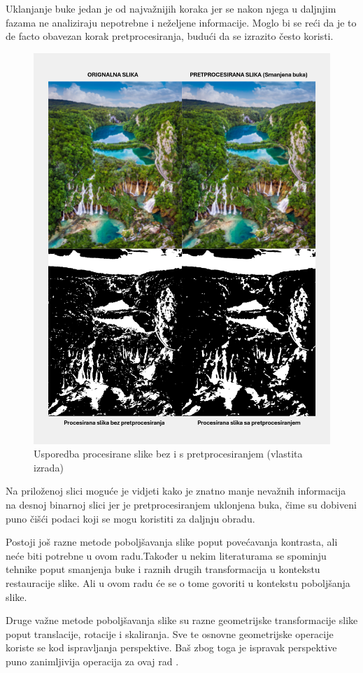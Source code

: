 \documentclass{foi}
\begin{document}
Uklanjanje buke jedan je od najvažnijih koraka jer se nakon njega u daljnjim fazama ne analiziraju nepotrebne i neželjene informacije. Moglo bi se reći da je to de facto obavezan korak pretprocesiranja, budući da se izrazito često koristi.

\begin{figure}[H] 
    \centering 
    \includegraphics[width=0.85\linewidth]{slike/withAndWithoutPreProcessing.png} 
    \caption{Usporedba procesirane slike bez i s pretprocesiranjem (vlastita izrada)} 
\end{figure}

Na priloženoj slici moguće je vidjeti kako je znatno manje nevažnih informacija na desnoj binarnoj slici jer je pretprocesiranjem uklonjena buka, čime su dobiveni puno čišći podaci koji se mogu koristiti za daljnju obradu.

Postoji još razne metode poboljšavanja slike poput povećavanja kontrasta, ali neće biti potrebne u ovom radu.Također u nekim literaturama se spominju tehnike poput smanjenja buke  i raznih drugih transformacija u kontekstu restauracije slike. Ali u ovom radu će se o tome govoriti u kontekstu poboljšanja slike.

Druge važne metode poboljšavanja slike su razne geometrijske transformacije slike poput translacije, rotacije i skaliranja. Sve te osnovne geometrijske operacije koriste se kod ispravljanja perspektive. Baš zbog toga je ispravak perspektive puno zanimljivija operacija za ovaj rad \cite{GeometryTransforms}.
\end{document}
